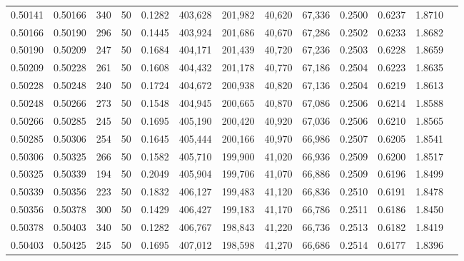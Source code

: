\begin{tabular}{rrrrrrrrrrrrr}
0.50141 & 0.50166 &   340 &  50 &                                     0.1282 & 403,628 & 201,982 &  40,620 &  67,336 & 0.2500 & 0.6237 & 1.8710 \\
0.50166 & 0.50190 &   296 &  50 &                                     0.1445 & 403,924 & 201,686 &  40,670 &  67,286 & 0.2502 & 0.6233 & 1.8682 \\
0.50190 & 0.50209 &   247 &  50 &                                     0.1684 & 404,171 & 201,439 &  40,720 &  67,236 & 0.2503 & 0.6228 & 1.8659 \\
0.50209 & 0.50228 &   261 &  50 &                                     0.1608 & 404,432 & 201,178 &  40,770 &  67,186 & 0.2504 & 0.6223 & 1.8635 \\
0.50228 & 0.50248 &   240 &  50 &                                     0.1724 & 404,672 & 200,938 &  40,820 &  67,136 & 0.2504 & 0.6219 & 1.8613 \\
0.50248 & 0.50266 &   273 &  50 &                                     0.1548 & 404,945 & 200,665 &  40,870 &  67,086 & 0.2506 & 0.6214 & 1.8588 \\
0.50266 & 0.50285 &   245 &  50 &                                     0.1695 & 405,190 & 200,420 &  40,920 &  67,036 & 0.2506 & 0.6210 & 1.8565 \\
0.50285 & 0.50306 &   254 &  50 &                                     0.1645 & 405,444 & 200,166 &  40,970 &  66,986 & 0.2507 & 0.6205 & 1.8541 \\
0.50306 & 0.50325 &   266 &  50 &                                     0.1582 & 405,710 & 199,900 &  41,020 &  66,936 & 0.2509 & 0.6200 & 1.8517 \\
0.50325 & 0.50339 &   194 &  50 &                                     0.2049 & 405,904 & 199,706 &  41,070 &  66,886 & 0.2509 & 0.6196 & 1.8499 \\
0.50339 & 0.50356 &   223 &  50 &                                     0.1832 & 406,127 & 199,483 &  41,120 &  66,836 & 0.2510 & 0.6191 & 1.8478 \\
0.50356 & 0.50378 &   300 &  50 &                                     0.1429 & 406,427 & 199,183 &  41,170 &  66,786 & 0.2511 & 0.6186 & 1.8450 \\
0.50378 & 0.50403 &   340 &  50 &                                     0.1282 & 406,767 & 198,843 &  41,220 &  66,736 & 0.2513 & 0.6182 & 1.8419 \\
0.50403 & 0.50425 &   245 &  50 &                                     0.1695 & 407,012 & 198,598 &  41,270 &  66,686 & 0.2514 & 0.6177 & 1.8396 \\

\end{tabular}
